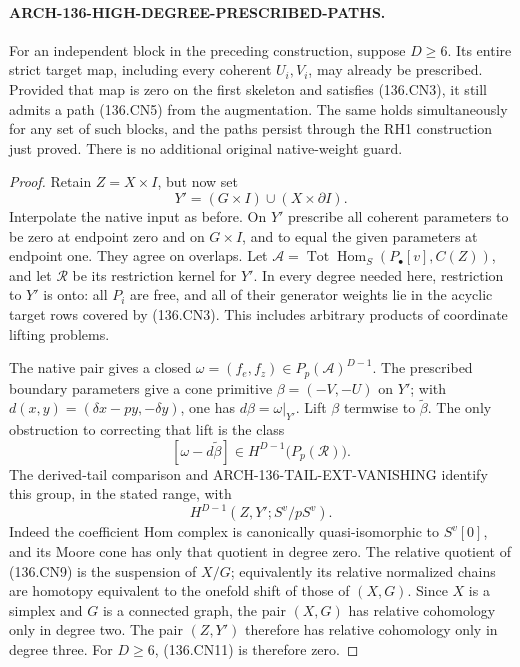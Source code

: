 \paragraph{ARCH-136-HIGH-DEGREE-PRESCRIBED-PATHS.}
For an independent block in the preceding construction, suppose
\(D\geq6\).  Its entire strict target map, including every
coherent \(U_i,V_i\), may already be prescribed.  Provided
that map is zero on the first skeleton and satisfies (136.CN3),
it still admits a path (136.CN5) from the augmentation.
The same holds simultaneously for any set of such blocks, and
the paths persist through the RH1 construction just proved.
There is no additional original native-weight guard.

\begin{proof}
Retain \(Z=X\times I\), but now set
\[
             Y'=(G\times I)\cup(X\times\partial I).
                                                               \tag{136.CN9}
\]
Interpolate the native input as before.  On \(Y'\) prescribe
all coherent parameters to be zero at endpoint zero and on
\(G\times I\), and to equal the given parameters at endpoint
one.  They agree on overlaps.  Let
\(\mathcal A=\operatorname{Tot}\operatorname{Hom}_S
(P_\bullet[v],C(Z))\), and let \(\mathcal R\) be its
restriction kernel for \(Y'\).  In every degree needed here,
restriction to \(Y'\) is onto: all \(P_i\) are free, and
all of their generator weights lie in the acyclic target rows
covered by (136.CN3).  This includes arbitrary products of
coordinate lifting problems.

The native pair gives a closed
\(\omega=(f_e,f_z)\in P_p(\mathcal A)^{D-1}\).
The prescribed boundary parameters give a cone primitive
\(\beta=(-V,-U)\) on \(Y'\); with
\(d(x,y)=(\delta x-py,-\delta y)\), one has
\(d\beta=\omega|_{Y'}\).  Lift \(\beta\) termwise
to \(\widetilde\beta\).  The only obstruction to correcting
that lift is the class
\[
 [\omega-d\widetilde\beta]\in
             H^{D-1}\bigl(P_p(\mathcal R)\bigr).
                                                               \tag{136.CN10}
\]
The derived-tail comparison and
ARCH-136-TAIL-EXT-VANISHING identify this group, in the stated
range, with
\[
                    H^{D-1}(Z,Y';S^v/pS^v).
                                                               \tag{136.CN11}
\]
Indeed the coefficient Hom complex is canonically
quasi-isomorphic to \(S^v[0]\), and its Moore cone has
only that quotient in degree zero.  The relative quotient of
(136.CN9) is the suspension of \(X/G\); equivalently its
relative normalized chains are homotopy equivalent to the
onefold shift of those of \((X,G)\).  Since \(X\) is a
simplex and \(G\) is a connected graph, the pair \((X,G)\)
has relative cohomology only in degree two.  The pair \((Z,Y')\)
therefore has relative cohomology only in degree three.
For \(D\geq6\), (136.CN11) is therefore zero.


\end{proof}
